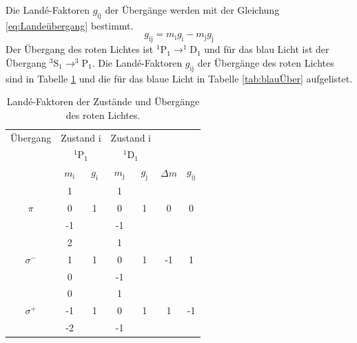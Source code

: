 \FloatBarrier
Die Landé-Faktoren $g_{\text{ij}}$ der Übergänge werden mit der Gleichung \eqref{eq:Landeübergang} bestimmt.
\begin{equation}
    \label{eq:Landeübergang}
    g_{\text{ij}} = m_{\text{i}}g_{\text{i}} - m_{\text{j}}g_{\text{j}}
\end{equation}
Der Übergang des roten Lichtes ist $^1\text{P}_1 \rightarrow ^1\text{D}_1$ und für das 
blau Licht ist der Übergang $^3\text{S}_1 \rightarrow ^3\text{P}_1$.
Die Landé-Faktoren $g_{\text{ij}}$ der Übergänge des roten Lichtes sind in Tabelle \ref{tab:rotÜber} und die
für das blaue Licht in Tabelle \ref{tab:blauÜber} aufgelistet.
\FloatBarrier
\begin{table}
    \centering
    \caption{Landé-Faktoren der Zustände und Übergänge des roten Lichtes.}
    \label{tab:rotÜber}
    \begin{tabular}{c| c c| c c| c c}
        \toprule
        Übergang&\multicolumn{2}{c|}{Zustand i}&\multicolumn{2}{c|}{Zustand i}&\\
                &\multicolumn{2}{c|}{$^1\text{P}_1$}&\multicolumn{2}{c|}{$^1\text{D}_1$}&\\
        \midrule
        &$m_\text{i}$&$g_\text{i}$&$m_\text{j}$&$g_\text{j}$&$\Delta m $&$g_{\text{ij}}$\\
        \midrule
        \multirow{3}{*}{$\pi$}&1&\multirow{3}{*}{1}&1&\multirow{3}{*}{1}&\multirow{3}{*}{0}&\multirow{3}{*}{0}\\
        &0&&0&&&\\
        &-1&&-1&&&\\
        \hline
        \multirow{3}{*}{$\sigma^-$}&2&\multirow{3}{*}{1}&1&\multirow{3}{*}{1}&\multirow{3}{*}{-1}&\multirow{3}{*}{1}\\
        &1&&0&&&\\
        &0&&-1&&&\\
        \hline
        \multirow{3}{*}{$\sigma^+$}&0&\multirow{3}{*}{1}&1&\multirow{3}{*}{1}&\multirow{3}{*}{1}&\multirow{3}{*}{-1}\\
        &-1&&0&&&\\
        &-2&&-1&&&\\
        \bottomrule
    \end{tabular}
\end{table}

